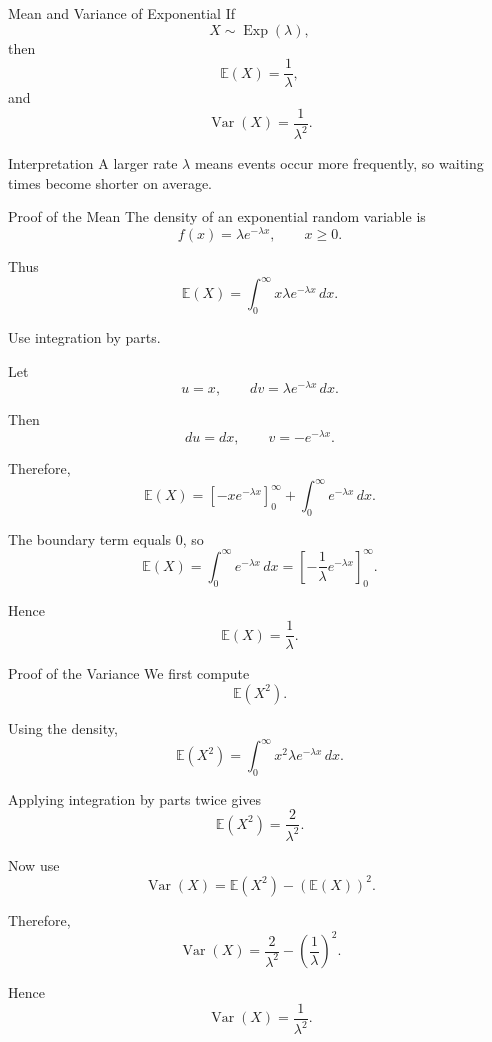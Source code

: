 \begin{frame}{Mean and Variance of Exponential}
If
\[
X\sim \operatorname{Exp}(\lambda),
\]
then
\[
\mathbb{E}(X)=\frac{1}{\lambda},
\]
and
\[
\operatorname{Var}(X)=\frac{1}{\lambda^2}.
\]

\vspace{0.25cm}

\begin{keybox}{Interpretation}
A larger rate $\lambda$ means events occur more frequently, so waiting times become shorter on average.
\end{keybox}
\end{frame}



\begin{frame}{Proof of the Mean}
The density of an exponential random variable is
\[
f(x)=\lambda e^{-\lambda x},
\qquad x\ge0.
\]

Thus
\[
\mathbb{E}(X)
=
\int_0^\infty x\lambda e^{-\lambda x}\,dx.
\]

Use integration by parts.

Let
\[
u=x,
\qquad
dv=\lambda e^{-\lambda x}\,dx.
\]

Then
\[
du=dx,
\qquad
v=-e^{-\lambda x}.
\]

Therefore,
\[
\mathbb{E}(X)
=
\left[
-x e^{-\lambda x}
\right]_0^\infty
+
\int_0^\infty e^{-\lambda x}\,dx.
\]

The boundary term equals $0$, so
\[
\mathbb{E}(X)
=
\int_0^\infty e^{-\lambda x}\,dx
=
\left[
-\frac1\lambda e^{-\lambda x}
\right]_0^\infty.
\]

Hence
\[
\mathbb{E}(X)=\frac1\lambda.
\]
\end{frame}



\begin{frame}{Proof of the Variance}
We first compute
\[
\mathbb{E}(X^2).
\]

Using the density,
\[
\mathbb{E}(X^2)
=
\int_0^\infty x^2\lambda e^{-\lambda x}\,dx.
\]

Applying integration by parts twice gives
\[
\mathbb{E}(X^2)=\frac{2}{\lambda^2}.
\]

Now use
\[
\operatorname{Var}(X)
=
\mathbb{E}(X^2)-(\mathbb{E}(X))^2.
\]

Therefore,
\[
\operatorname{Var}(X)
=
\frac{2}{\lambda^2}
-
\left(\frac1\lambda\right)^2.
\]

Hence
\[
\operatorname{Var}(X)
=
\frac1{\lambda^2}.
\]
\end{frame}

